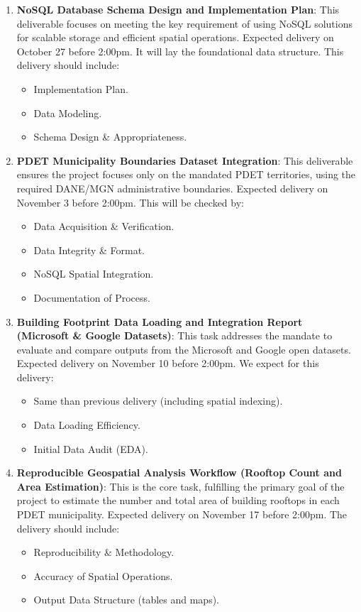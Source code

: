 \documentclass[12pt]{article}
\begin{document}
\begin{enumerate}
  \item \textbf{NoSQL Database Schema Design and Implementation Plan}:  This deliverable focuses on meeting the key requirement of using NoSQL solutions for scalable storage and efficient spatial operations.  Expected delivery on October 27 before 2:00pm. It will lay the foundational data structure.  This delivery should include:
    \begin{itemize}
      \item Implementation Plan.
      \item Data Modeling.
      \item Schema Design \& Appropriateness.
    \end{itemize}

  \item \textbf{PDET Municipality Boundaries Dataset Integration}: This deliverable ensures the project focuses only on the mandated PDET territories, using the required DANE/MGN administrative boundaries. Expected delivery on November 3 before 2:00pm. This will be checked by:
    \begin{itemize}
      \item Data Acquisition \& Verification.
      \item Data Integrity \& Format.
      \item NoSQL Spatial Integration.
      \item Documentation of Process.
    \end{itemize}

  \item \textbf{Building Footprint Data Loading and Integration Report (Microsoft \& Google Datasets)}:  This task addresses the mandate to evaluate and compare outputs from the Microsoft and Google open datasets. Expected delivery on November 10 before 2:00pm. We expect for this delivery:
    \begin{itemize}
      \item Same than previous delivery (including spatial indexing).
      \item Data Loading Efficiency.
      \item Initial Data Audit (EDA).
    \end{itemize}

  \item \textbf{Reproducible Geospatial Analysis Workflow (Rooftop Count and Area Estimation)}: This is the core task, fulfilling the primary goal of the project to estimate the number and total area of building rooftops in each PDET municipality. Expected delivery on November 17 before 2:00pm. The delivery should include:
    \begin{itemize}
      \item Reproducibility \& Methodology.
      \item Accuracy of Spatial Operations.
      \item Output Data Structure (tables and maps).
    \end{itemize}


\end{enumerate}
\end{document}
